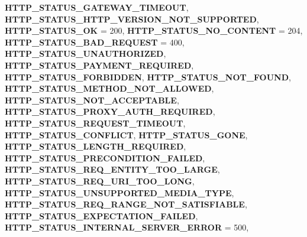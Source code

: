 \begin{DoxyCompactItemize}
\newline
{\bfseries H\+T\+T\+P\+\_\+\+S\+T\+A\+T\+U\+S\+\_\+\+G\+A\+T\+E\+W\+A\+Y\+\_\+\+T\+I\+M\+E\+O\+UT}, 
{\bfseries H\+T\+T\+P\+\_\+\+S\+T\+A\+T\+U\+S\+\_\+\+H\+T\+T\+P\+\_\+\+V\+E\+R\+S\+I\+O\+N\+\_\+\+N\+O\+T\+\_\+\+S\+U\+P\+P\+O\+R\+T\+ED}, 
{\bfseries H\+T\+T\+P\+\_\+\+S\+T\+A\+T\+U\+S\+\_\+\+OK} = 200, 
{\bfseries H\+T\+T\+P\+\_\+\+S\+T\+A\+T\+U\+S\+\_\+\+N\+O\+\_\+\+C\+O\+N\+T\+E\+NT} = 204, 
\newline
{\bfseries H\+T\+T\+P\+\_\+\+S\+T\+A\+T\+U\+S\+\_\+\+B\+A\+D\+\_\+\+R\+E\+Q\+U\+E\+ST} = 400, 
{\bfseries H\+T\+T\+P\+\_\+\+S\+T\+A\+T\+U\+S\+\_\+\+U\+N\+A\+U\+T\+H\+O\+R\+I\+Z\+ED}, 
{\bfseries H\+T\+T\+P\+\_\+\+S\+T\+A\+T\+U\+S\+\_\+\+P\+A\+Y\+M\+E\+N\+T\+\_\+\+R\+E\+Q\+U\+I\+R\+ED}, 
{\bfseries H\+T\+T\+P\+\_\+\+S\+T\+A\+T\+U\+S\+\_\+\+F\+O\+R\+B\+I\+D\+D\+EN}, 
\newline
{\bfseries H\+T\+T\+P\+\_\+\+S\+T\+A\+T\+U\+S\+\_\+\+N\+O\+T\+\_\+\+F\+O\+U\+ND}, 
{\bfseries H\+T\+T\+P\+\_\+\+S\+T\+A\+T\+U\+S\+\_\+\+M\+E\+T\+H\+O\+D\+\_\+\+N\+O\+T\+\_\+\+A\+L\+L\+O\+W\+ED}, 
{\bfseries H\+T\+T\+P\+\_\+\+S\+T\+A\+T\+U\+S\+\_\+\+N\+O\+T\+\_\+\+A\+C\+C\+E\+P\+T\+A\+B\+LE}, 
{\bfseries H\+T\+T\+P\+\_\+\+S\+T\+A\+T\+U\+S\+\_\+\+P\+R\+O\+X\+Y\+\_\+\+A\+U\+T\+H\+\_\+\+R\+E\+Q\+U\+I\+R\+ED}, 
\newline
{\bfseries H\+T\+T\+P\+\_\+\+S\+T\+A\+T\+U\+S\+\_\+\+R\+E\+Q\+U\+E\+S\+T\+\_\+\+T\+I\+M\+E\+O\+UT}, 
{\bfseries H\+T\+T\+P\+\_\+\+S\+T\+A\+T\+U\+S\+\_\+\+C\+O\+N\+F\+L\+I\+CT}, 
{\bfseries H\+T\+T\+P\+\_\+\+S\+T\+A\+T\+U\+S\+\_\+\+G\+O\+NE}, 
{\bfseries H\+T\+T\+P\+\_\+\+S\+T\+A\+T\+U\+S\+\_\+\+L\+E\+N\+G\+T\+H\+\_\+\+R\+E\+Q\+U\+I\+R\+ED}, 
\newline
{\bfseries H\+T\+T\+P\+\_\+\+S\+T\+A\+T\+U\+S\+\_\+\+P\+R\+E\+C\+O\+N\+D\+I\+T\+I\+O\+N\+\_\+\+F\+A\+I\+L\+ED}, 
{\bfseries H\+T\+T\+P\+\_\+\+S\+T\+A\+T\+U\+S\+\_\+\+R\+E\+Q\+\_\+\+E\+N\+T\+I\+T\+Y\+\_\+\+T\+O\+O\+\_\+\+L\+A\+R\+GE}, 
{\bfseries H\+T\+T\+P\+\_\+\+S\+T\+A\+T\+U\+S\+\_\+\+R\+E\+Q\+\_\+\+U\+R\+I\+\_\+\+T\+O\+O\+\_\+\+L\+O\+NG}, 
{\bfseries H\+T\+T\+P\+\_\+\+S\+T\+A\+T\+U\+S\+\_\+\+U\+N\+S\+U\+P\+P\+O\+R\+T\+E\+D\+\_\+\+M\+E\+D\+I\+A\+\_\+\+T\+Y\+PE}, 
\newline
{\bfseries H\+T\+T\+P\+\_\+\+S\+T\+A\+T\+U\+S\+\_\+\+R\+E\+Q\+\_\+\+R\+A\+N\+G\+E\+\_\+\+N\+O\+T\+\_\+\+S\+A\+T\+I\+S\+F\+I\+A\+B\+LE}, 
{\bfseries H\+T\+T\+P\+\_\+\+S\+T\+A\+T\+U\+S\+\_\+\+E\+X\+P\+E\+C\+T\+A\+T\+I\+O\+N\+\_\+\+F\+A\+I\+L\+ED}, 
{\bfseries H\+T\+T\+P\+\_\+\+S\+T\+A\+T\+U\+S\+\_\+\+I\+N\+T\+E\+R\+N\+A\+L\+\_\+\+S\+E\+R\+V\+E\+R\+\_\+\+E\+R\+R\+OR} = 500, 

\end{DoxyCompactItemize}

